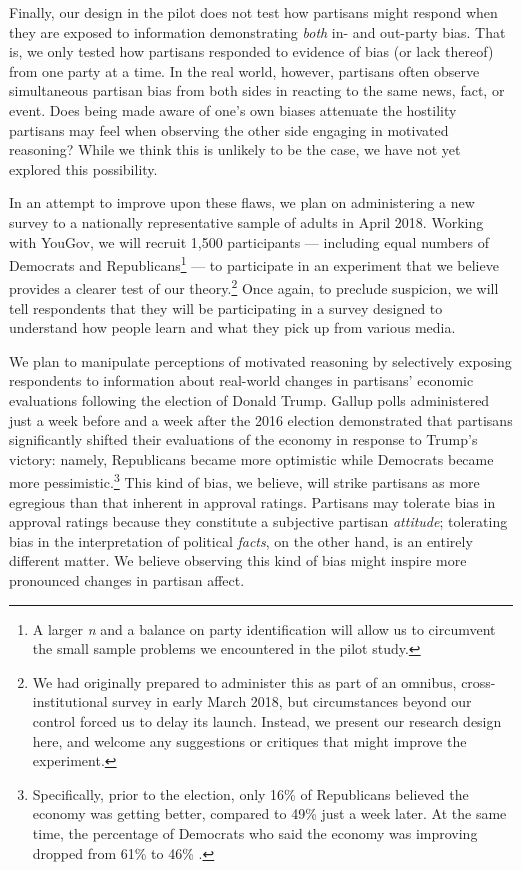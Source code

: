 \documentclass[12pt, letterpaper]{article}
\begin{document}
Finally, our design in the pilot does not test how partisans might respond when they are exposed to information demonstrating \textit{both} in- and out-party bias. That is, we only tested how partisans responded to evidence of bias (or lack thereof) from one party at a time. In the real world, however, partisans often observe simultaneous partisan bias from both sides in reacting to the same news, fact, or event. Does being made aware of one's own biases attenuate the hostility partisans may feel when observing the other side engaging in motivated reasoning? While we think this is unlikely to be the case, we have not yet explored this possibility. 

In an attempt to improve upon these flaws, we plan on administering a new survey to a nationally representative sample of adults in April 2018. Working with YouGov, we will recruit 1,500 participants --- including equal numbers of Democrats and Republicans\footnote{A larger \textit{n} and a balance on party identification will allow us to circumvent the small sample problems we encountered in the pilot study.}  --- to participate in an experiment that we believe provides a clearer test of our theory.\footnote{We had originally prepared to administer this as part of an omnibus, cross-institutional survey in early March 2018, but circumstances beyond our control forced us to delay its launch. Instead, we present our research design here, and welcome any suggestions or critiques that might improve the experiment.} Once again, to preclude suspicion, we will tell respondents that they will be participating in a survey designed to understand how people learn and what they pick up from various media. 

We plan to manipulate perceptions of motivated reasoning by selectively exposing respondents to information about real-world changes in partisans' economic evaluations following the election of Donald Trump. Gallup polls administered just a week before and a week after the 2016 election demonstrated that partisans significantly shifted their evaluations of the economy in response to Trump's victory: namely, Republicans became more optimistic while Democrats became more pessimistic.\footnote{Specifically, prior to the election, only 16\% of Republicans believed the economy was getting better, compared to 49\% just a week later. At the same time, the percentage of Democrats who said the economy was improving dropped from 61\% to 46\% \citep{gallup_econ}.} This kind of bias, we believe, will strike partisans as more egregious than that inherent in approval ratings. Partisans may tolerate bias in approval ratings because they constitute a subjective partisan \textit{attitude}; tolerating bias in the interpretation of political \textit{facts}, on the other hand, is an entirely different matter. We believe observing this kind of bias might inspire more pronounced changes in partisan affect. 
\end{document}
